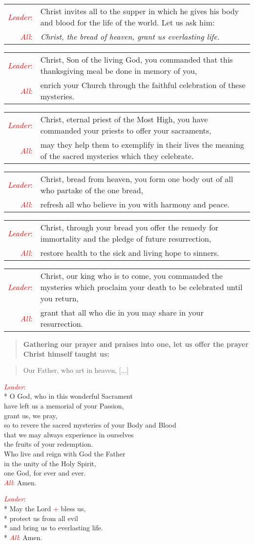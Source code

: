 \documentclass[letterpaper,14pt]{extarticle}
\newcommand{\side}[1]{\flagverse{\textcolor{red}{\textit{#1}}:}}
\newcommand{\sidestar}[1]{\textcolor{red}{\textit{#1}:}}
\newcommand{\rednote}[1]{\textcolor{red}{#1}}
\newlength{\oldindent}
\newcommand{\antiphon}[2]{
	\setlength{\oldindent}{\vindent}
	\setlength{\vindent}{0em}
	\begin{verse}
	\side{#1} \textbf{#2}
	\end{verse}
	\setlength{\vindent}{\oldindent}
}
\newcommand{\intercession}[2]{
	\begin{tabular}[h]{r p{4.25in}}
		\sidestar{Leader} & #1 \\
		\sidestar{All} & #2
	\end{tabular}}
\begin{document}

\intercession{Christ invites all to the supper in which he gives his body and
blood for the life of the world. Let us ask him:}
{\textit{Christ, the bread of heaven, grant us everlasting life.}}

\intercession{Christ, Son of the living God, you commanded that this
thanksgiving meal be done in memory of you,}
{enrich your Church through the faithful celebration of these mysteries.}

\intercession{Christ, eternal priest of the Most High, you have commanded your
priests to offer your sacraments,}
{may they help them to exemplify in their lives the meaning of the sacred
mysteries which they celebrate.}

\intercession{Christ, bread from heaven, you form one body out of all who
partake of the one bread,}
{refresh all who believe in you with harmony and peace.}

\intercession{Christ, through your bread you offer the remedy for immortality
and the pledge of future resurrection,}
{restore health to the sick and living hope to sinners.}

\intercession{Christ, our king who is to come, you commanded the mysteries
which proclaim your death to be celebrated until you return,}
{grant that all who die in you may share in your resurrection.}

\antiphon{Leader}{Gathering our prayer and praises into one, let us offer the
prayer Christ himself taught us:}
\begin{verse}
	\side{All} Our Father, who art in heaven, [...] %
\end{verse}

\sidestar{Leader}\\*
O God, who in this wonderful Sacrament \\
have left us a memorial of your Passion, \\
grant us, we pray, \\ 
so to revere the sacred mysteries of your Body and Blood \\
that we may always experience in ourselves \\
the fruits of your redemption. \\
Who live and reign with God the Father \\
in the unity of the Holy Spirit, \\
one God, for ever and ever. \\
\sidestar{All} Amen.


\sidestar{Leader}\\*
May the Lord \rednote{+} bless us, \\*
protect us from all evil \\*
and bring us to everlasting life. \\*
\sidestar{All} Amen.
\end{document}
